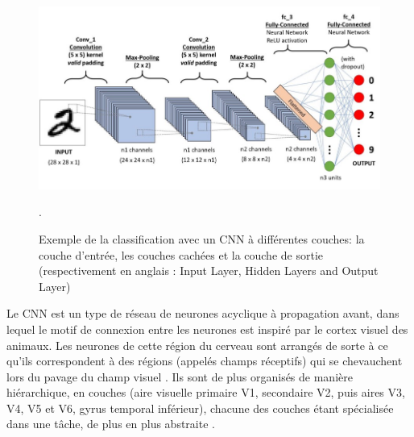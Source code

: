 	\begin{figure}[H]%
		\centering
		\includegraphics[width=\textwidth]{images/cnn_image1}
		\caption[Exemple de la classification avec un CNN a différentes couches]{Exemple de la classification avec un CNN à différentes couches: la couche d'entrée, les couches cachées et la couche de sortie (respectivement en anglais : Input Layer, Hidden Layers and Output Layer) \cite{ml2008python}}.
		\label{fig:cnn_layers}
	\end{figure}
	
	Le CNN est un type de réseau de neurones acyclique à propagation avant, dans lequel le motif de connexion entre les neurones est inspiré par le cortex visuel des animaux. Les neurones de cette région du cerveau sont arrangés de sorte à ce qu'ils correspondent à des régions (appelés champs réceptifs) qui se chevauchent lors du pavage du champ visuel \cite{goodfellow2016deep}. Ils sont de plus organisés de manière hiérarchique, en couches (aire visuelle primaire V1, secondaire V2, puis aires V3, V4, V5 et V6, gyrus temporal inférieur), chacune des couches étant spécialisée dans une tâche, de plus en plus abstraite \cite{antoine2018apprentissage}. %
	
